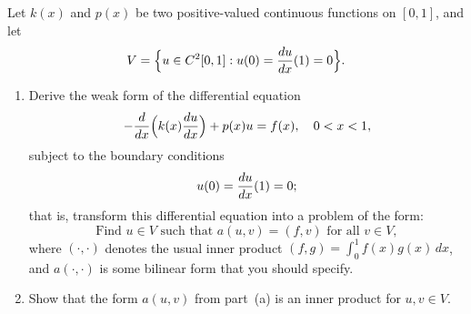 
Let $k(x)$ and $p(x)$ be two positive-valued continuous functions on $[0,1]$,
and let 
\[ V = \Big\{ u\in C^2[0,1]: u(0) = {du\over dx}(1) = 0 \Big\}.\]
\begin{enumerate}
\item Derive the weak form of the differential equation
\[ -{d\over dx} \Big(k(x) {du \over dx}\Big) + p(x) u = f(x), 
    \quad 0 < x< 1,\]
subject to the boundary conditions
\[  u(0) = {du\over dx}(1) = 0;\]
that is, transform this differential equation into a problem of the form:
\[\mbox{Find $u \in V$ such that $a(u,v) = (f,v)$ for all $v\in V$},\]
where $(\cdot,\cdot)$ denotes the usual inner product
$(f, g) = \int_0^1 f(x) g(x)\, dx$,
and $a(\cdot, \cdot)$ is some bilinear form that you should specify.

\item Show that the form $a(u,v)$ from part~(a) is an inner product
      for $u, v \in V$.
\end{enumerate}

